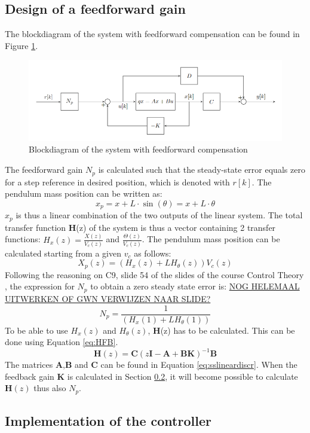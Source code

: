 \documentclass[a4paper,kul]{kulakarticle} %
\begin{document}
	\subsection{Design of a feedforward gain}
	
	The blockdiagram of the system with feedforward compensation can be found in Figure \ref{fig:blockdiagram}. 
	
	\begin{figure}[htp!]
		\centering
		\includegraphics[width=.7\linewidth]{blockdiagram.png}
		\caption{Blockdiagram of the system with feedforward compensation }
		\label{fig:blockdiagram}
	\end{figure}
	The feedforward gain $N_p$ is calculated such that the steady-state error equals zero for a step reference in desired position, which is denoted with $r[k]$. The pendulum mass position can be written as:
	\begin{equation}
	x_p = x + L\cdot \sin(\theta) = x + L\cdot \theta
	\end{equation}
	$x_p$ is thus a linear combination of the two outputs of the linear system. The total transfer function \textbf{H}(z) of the system is thus a vector containing 2 transfer functions: $H_x(z) = \frac{X(z)}{V_c(z)}$ and $\frac{\Theta(z)}{V_c(z)}$. The pendulum mass position can be calculated starting from a given $v_c$ as follows:
	\begin{equation}
	X_p(z) = (H_x(z) + LH_\theta(z))V_c(z)
	\end{equation}
	Following the reasoning on C9, slide 54 of the slides of the course Control Theory \cite{slidescontroltheory}, the expression for $N_p$ to  obtain a zero steady state error is: \underline{NOG HELEMAAL UITWERKEN OF GWN VERWIJZEN NAAR SLIDE?}
	\begin{equation}
	N_p = \frac{1}{(H_x(1) + LH_\theta(1))}
	\end{equation}
	To be able to use $H_x(z)$ and $H_\theta(z)$, \textbf{H}(z) has to be calculated. This can be done using Equation \ref{eq:HFB}. 
	\begin{equation}
	\mathbf{H}(z) = \mathbf{C}(z\mathbf{I}-\mathbf{A}+\mathbf{BK})^{-1}\mathbf{B}
	\label{eq:HFB}
	\end{equation}
	The matrices $\mathbf{A}$,$\mathbf{B}$ and $\mathbf{C}$ can be found in Equation \ref{eq:sslineardiscr}. When the feedback gain $\mathbf{K}$ is calculated in Section \ref{sec:implFBcontr}, it will become possible to calculate $\mathbf{H}(z)$ thus also $N_p$. 
	\subsection{Implementation of the controller}
	\label{sec:implFBcontr}
	
	
	
	
\end{document}
